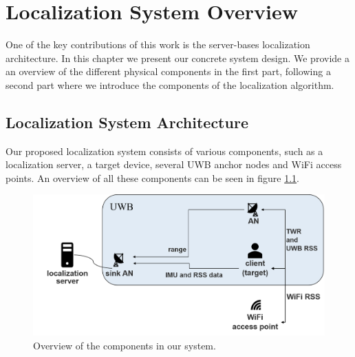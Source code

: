
\chapter{Localization System Overview} %

\label{Chapter4} %
One of the key contributions of this work is the server-bases localization architecture. In this chapter we present our concrete system design. We provide a an overview of the different physical components in the first part, following a second part where we introduce the components of the localization algorithm. 


\section{Localization System Architecture}
Our proposed localization system consists of various components, such as a localization server, a target device, several UWB anchor nodes and WiFi access points. An overview of all these components can be seen in figure \ref{fig:system_components}.\\
\begin{figure}[th]
\centering
\includegraphics[width=1.0\textwidth]{Figures/system_components}
\decoRule
\caption[System Architecture]{Overview of the components in our system.}
\label{fig:system_components}
\end{figure}

